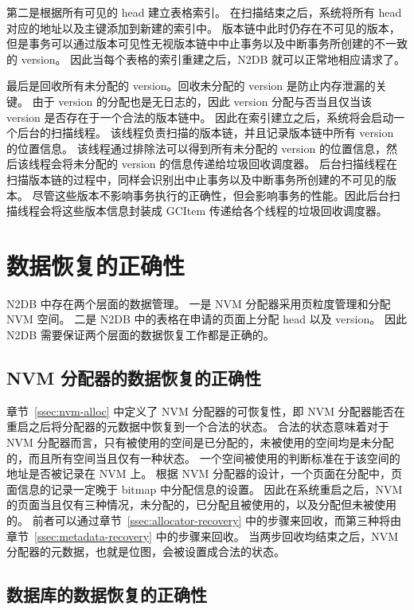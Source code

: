 第二是根据所有可见的 head 建立表格索引。
在扫描结束之后，系统将所有 head 对应的地址以及主键添加到新建的索引中。
版本链中此时仍存在不可见的版本，但是事务可以通过版本可见性无视版本链中中止事务以及中断事务所创建的不一致的 version。
因此当每个表格的索引重建之后，N2DB 就可以正常地相应请求了。

最后是回收所有未分配的 version。回收未分配的 version 是防止内存泄漏的关键。
由于 version 的分配也是无日志的，因此 version 分配与否当且仅当该 version 是否存在于一个合法的版本链中。
因此在索引建立之后，系统将会启动一个后台的扫描线程。
该线程负责扫描的版本链，并且记录版本链中所有 version 的位置信息。
该线程通过排除法可以得到所有未分配的 version 的位置信息，然后该线程会将未分配的 version 的信息传递给垃圾回收调度器。
后台扫描线程在扫描版本链的过程中，同样会识别出中止事务以及中断事务所创建的不可见的版本。
尽管这些版本不影响事务执行的正确性，但会影响事务的性能。因此后台扫描线程会将这些版本信息封装成 GCItem 传递给各个线程的垃圾回收调度器。

\section{数据恢复的正确性}

N2DB 中存在两个层面的数据管理。
一是 NVM 分配器采用页粒度管理和分配 NVM 空间。
二是 N2DB 中的表格在申请的页面上分配 head 以及 version。
因此 N2DB 需要保证两个层面的数据恢复工作都是正确的。

\subsection{NVM 分配器的数据恢复的正确性}

章节~\ref{ssec:nvm-alloc} 中定义了 NVM 分配器的可恢复性，即 NVM 分配器能否在重启之后将分配器的元数据中恢复到一个合法的状态。
合法的状态意味着对于 NVM 分配器而言，只有被使用的空间是已分配的，未被使用的空间均是未分配的，而且所有空间当且仅有一种状态。
一个空间被使用的判断标准在于该空间的地址是否被记录在 NVM 上。
根据 NVM 分配器的设计，一个页面在分配中，页面信息的记录一定晚于 bitmap 中分配信息的设置。
因此在系统重启之后，NVM 的页面当且仅有三种情况，未分配的，已分配且被使用的，以及分配但未被使用的。
前者可以通过章节~\ref{ssec:allocator-recovery} 中的步骤来回收，而第三种将由章节~\ref{ssec:metadata-recovery} 中的步骤来回收。
当两步回收均结束之后，NVM 分配器的元数据，也就是位图，会被设置成合法的状态。

\subsection{数据库的数据恢复的正确性}

